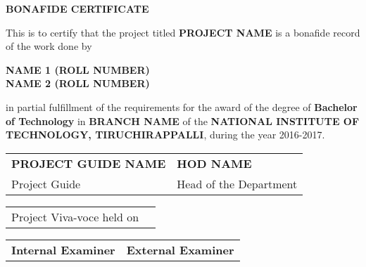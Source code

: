 \thispagestyle{plain}
\begin{center}
\textbf{BONAFIDE CERTIFICATE}
\end{center}

\vspace{0.3cm}
\fontsize{12pt}{24pt}\selectfont This is to certify that the project titled \textbf{PROJECT NAME} is a bonafide record of the work done by
\vspace{1.0cm}

\begin{center}
\textbf{NAME 1 (ROLL NUMBER)\\NAME 2 (ROLL NUMBER)}
\end{center}

\vspace{1.0cm}
\noindent
\fontsize{12pt}{24pt}\selectfont in partial fulfillment of the requirements for the award of the degree of \textbf{Bachelor of Technology} in \textbf{BRANCH NAME} of the \textbf{NATIONAL INSTITUTE OF TECHNOLOGY, TIRUCHIRAPPALLI}, during the year 2016-2017.

\vspace{2.5cm}

\begin{tabu} to \textwidth { X[l] X[c] }

 \textbf{PROJECT GUIDE NAME} & \textbf{HOD NAME} \\
 Project Guide & Head of the Department

\end{tabu}

\vspace{2.0cm}
\noindent
\begin{tabular}{lc}
\fontsize{12pt}{24pt}\selectfont Project Viva-voce held on & \underline{\hspace{2in}}
\end{tabular}

\vspace{3.5cm}

\begin{tabu} to \textwidth { X[l] X[c] }

 \textbf{Internal Examiner} & \textbf{External Examiner}

\end{tabu}

\newpage